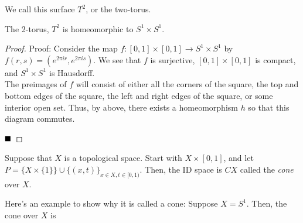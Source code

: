 We call this surface $T^2$, or the two-torus.

\begin{lemma}
    The 2-torus, $T^2$ is homeomorphic to $S^1 \times S^1$.
\end{lemma}
\begin{proof}{Proof:}
    Consider the map $f : [0, 1] \times [0, 1] \to S^1 \times S^1$ by $f(r, s) = (e^{2\pi i r}, e^{2\pi i s})$. We see that $f$ is surjective, $[0, 1] \times [0, 1]$ is compact, and $S^1 \times S^1$ is Hausdorff. \\

    The preimages of $f$ will consist of either all the corners of the square, the top and bottom edges of the square, the left and right edges of the square, or some interior open set. Thus, by above, there exists a homeomorphism $h$ so that this diagram commutes.

    \begin{center}
    \end{center}

    $\qed$
\end{proof}

\begin{definition}
    Suppose that $X$ is a topological space. Start with $X \times [0, 1]$, and let $P = \{X \times \{1\}\} \cup \{(x, t)\}_{x \in X, t \in [0, 1)}$. Then, the ID space is $CX$ called the \emph{cone} over $X$. 
\end{definition}

Here's an example to show why it is called a cone: Suppose $X = S^1$. Then, the cone over $X$ is
